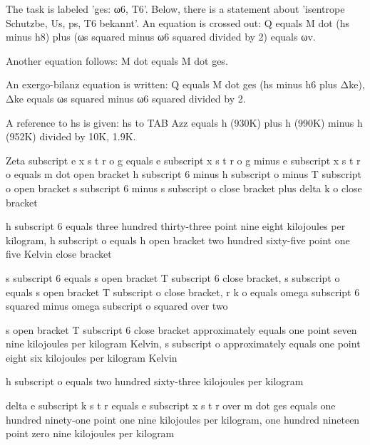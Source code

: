 The task is labeled 'ges: ω6, T6'. Below, there is a statement about 'isentrope Schutzbe, Us, ps, T6 bekannt'. An equation is crossed out: Q equals M dot (hs minus h8) plus (ωs squared minus ω6 squared divided by 2) equals ωv. 

Another equation follows: M dot equals M dot ges. 

An exergo-bilanz equation is written: Q equals M dot ges (hs minus h6 plus Δke), Δke equals ωs squared minus ω6 squared divided by 2. 

A reference to hs is given: hs to TAB Azz equals h (930K) plus h (990K) minus h (952K) divided by 10K, 1.9K.

Zeta subscript e x s t r o g equals e subscript x s t r o g minus e subscript x s t r o equals m dot open bracket h subscript 6 minus h subscript o minus T subscript o open bracket s subscript 6 minus s subscript o close bracket plus delta k o close bracket

h subscript 6 equals three hundred thirty-three point nine eight kilojoules per kilogram, h subscript o equals h open bracket two hundred sixty-five point one five Kelvin close bracket

s subscript 6 equals s open bracket T subscript 6 close bracket, s subscript o equals s open bracket T subscript o close bracket, r k o equals omega subscript 6 squared minus omega subscript o squared over two

s open bracket T subscript 6 close bracket approximately equals one point seven nine kilojoules per kilogram Kelvin, s subscript o approximately equals one point eight six kilojoules per kilogram Kelvin

h subscript o equals two hundred sixty-three kilojoules per kilogram

delta e subscript k s t r equals e subscript x s t r over m dot ges equals one hundred ninety-one point one nine kilojoules per kilogram, one hundred nineteen point zero nine kilojoules per kilogram